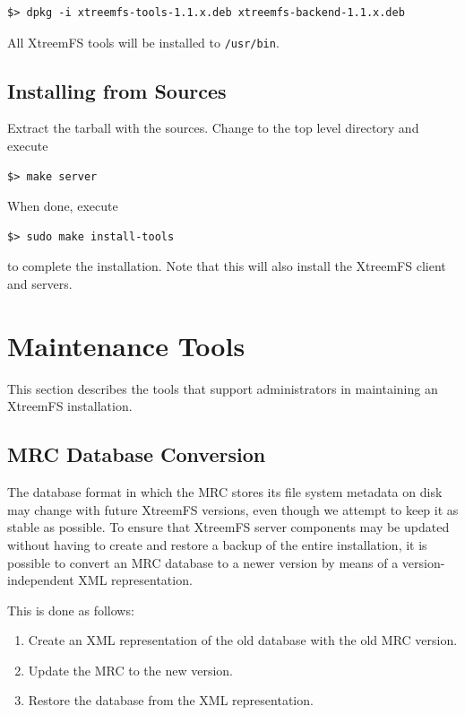 \documentclass[a4paper,10pt]{book}
\begin{document}
\begin{verbatim}
$> dpkg -i xtreemfs-tools-1.1.x.deb xtreemfs-backend-1.1.x.deb
\end{verbatim}


All XtreemFS tools will be installed to \texttt{/usr/bin}.

\subsection{Installing from Sources}

Extract the tarball with the sources. Change to the top level directory and execute

\begin{verbatim}
$> make server
\end{verbatim}

When done, execute

\begin{verbatim}
$> sudo make install-tools
\end{verbatim}

to complete the installation. Note that this will also install the XtreemFS client and servers.

\section{Maintenance Tools}

This section describes the tools that support administrators in maintaining an XtreemFS installation.

\subsection{MRC Database Conversion}
\label{sec:mrcdbtools}

The database format in which the MRC stores its file system metadata on disk may change with future XtreemFS versions, even though we attempt to keep it as stable as possible. To ensure that XtreemFS server components may be updated without having to create and restore a backup of the entire installation, it is possible to convert an MRC database to a newer version by means of a version-independent XML representation.

This is done as follows:
\begin{enumerate}
  \item Create an XML representation of the old database with the old MRC version.
  \item Update the MRC to the new version.
  \item Restore the database from the XML representation.
\end{enumerate}
\end{document}
